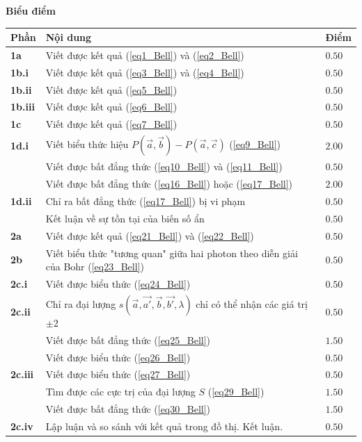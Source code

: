 \textbf{Biểu điểm}
\begin{center}
\begin{tabular}{|>{\centering\arraybackslash}m{1cm}|>{\raggedright\arraybackslash}m{14cm}| >{\centering\arraybackslash}m{1cm}|}
    \hline
    \textbf{Phần} & \textbf{Nội dung} & \textbf{Điểm} \\
    \hline
    \textbf{1a} & Viết được kết quả (\ref{eq1_Bell}) và (\ref{eq2_Bell}) & $0.50$ \\
    \hline 
    \textbf{1b.i} & Viết được kết quả (\ref{eq3_Bell}) và (\ref{eq4_Bell}) & $0.50$ \\
    \hline 
    \textbf{1b.ii} & Viết được kết quả (\ref{eq5_Bell}) & $0.50$ \\
    \hline 
    \textbf{1b.iii} & Viết được kết quả (\ref{eq6_Bell}) & $0.50$ \\
    \hline 
    \textbf{1c} & Viết được kết quả (\ref{eq7_Bell}) & $0.50$ \\
    \hline 
    \textbf{1d.i} & Viết biểu thức hiệu $P(\Vec{a},\Vec{b})-P(\Vec{a},\Vec{c})$ (\ref{eq9_Bell}) & $2.00$ \\
    \cline{2-3}
    &  Viết được bất đẳng thức (\ref{eq10_Bell}) và (\ref{eq11_Bell}) & $0.50$ \\
    \cline{2-3}
    &  Viết được bất đẳng thức (\ref{eq16_Bell}) hoặc (\ref{eq17_Bell}) & $2.00$ \\
    \hline
    \textbf{1d.ii} & Chỉ ra bất đẳng thức (\ref{eq17_Bell}) bị vi phạm & $0.50$ \\
    \cline{2-3}
    &  Kết luận về sự tồn tại của biến số ẩn & $0.50$ \\
    \hline
    \textbf{2a} & Viết được kết quả (\ref{eq21_Bell}) và (\ref{eq22_Bell}) & $0.50$ \\
    \hline
    \textbf{2b} & Viết biểu thức "tương quan" giữa hai photon theo diễn giải của Bohr (\ref{eq23_Bell}) & $0.50$ \\
    \hline
    \textbf{2c.i} & Viết được biểu thức (\ref{eq24_Bell}) & $0.50$ \\
    \hline
    \textbf{2c.ii} & Chỉ ra đại lượng $s(\Vec{a},\Vec{a'},\Vec{b},\Vec{b'},\lambda)$ chỉ có thể nhận các giá trị $\pm 2$ & $0.50$ \\
    \cline{2-3}
    & Viết được bất đẳng thức (\ref{eq25_Bell}) & $1.50$ \\
    \cline{2-3}
    & Viết được biểu thức (\ref{eq26_Bell}) & $0.50$ \\
    \hline
    \textbf{2c.iii} & Viết được biểu thức (\ref{eq27_Bell}) & $0.50$ \\
    \cline{2-3}
    & Tìm được các cực trị của đại lượng $S$ (\ref{eq29_Bell}) & $1.50$ \\
    \cline{2-3}
    & Viết được bất đẳng thức (\ref{eq30_Bell}) & $1.50$ \\
    \hline
    \textbf{2c.iv} & Lập luận và so sánh với kết quả trong đồ thị. Kết luận. & $0.50$ \\
    \hline
\end{tabular}
\end{center}

